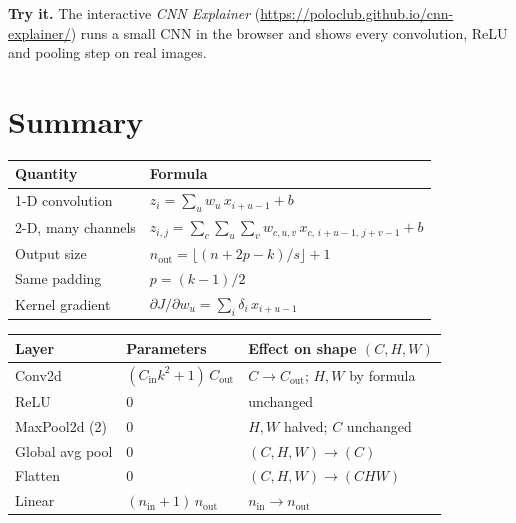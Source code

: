 \documentclass[12pt, a4paper]{article}
\begin{document}
\begin{notebox}
  \textbf{Try it.} The interactive \emph{CNN Explainer}
  (\url{https://poloclub.github.io/cnn-explainer/}) runs a small CNN in the
  browser and shows every convolution, ReLU and pooling step on real images.
\end{notebox}

\section{Summary}

\begin{center}
  \renewcommand{\arraystretch}{1.5}
  \begin{tabular}{ll}
    \toprule
    Quantity           & Formula                                                                    \\
    \midrule
    1-D convolution    & $z_i = \sum_{u} w_u\, x_{i+u-1} + b$                                       \\
    2-D, many channels & $z_{i,j} = \sum_{c}\sum_{u}\sum_{v} w_{c,u,v}\, x_{c,\,i+u-1,\,j+v-1} + b$ \\
    Output size        & $n_{\text{out}} = \lfloor (n + 2p - k)/s \rfloor + 1$                      \\
    Same padding       & $p = (k-1)/2$                                                              \\
    Kernel gradient    & $\partial J / \partial w_u = \sum_i \delta_i\, x_{i+u-1}$                  \\
    \bottomrule
  \end{tabular}
\end{center}

\begin{center}
  \renewcommand{\arraystretch}{1.35}
  \begin{tabular}{lll}
    \toprule
    Layer           & Parameters                                 & Effect on shape $(C, H, W)$               \\
    \midrule
    Conv2d          & $(C_{\text{in}} k^2 + 1)\, C_{\text{out}}$ & $C \to C_{\text{out}}$; $H, W$ by formula \\
    ReLU            & 0                                          & unchanged                                 \\
    MaxPool2d (2)   & 0                                          & $H, W$ halved; $C$ unchanged              \\
    Global avg pool & 0                                          & $(C, H, W) \to (C)$                       \\
    Flatten         & 0                                          & $(C, H, W) \to (C H W)$                   \\
    Linear          & $(n_{\text{in}} + 1)\, n_{\text{out}}$     & $n_{\text{in}} \to n_{\text{out}}$        \\
    \bottomrule
  \end{tabular}
\end{center}
\end{document}
